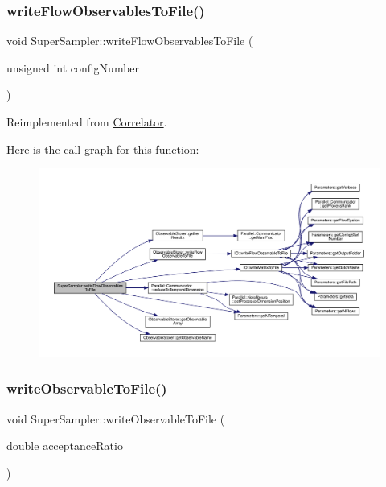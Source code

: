 \subsubsection{\texorpdfstring{writeFlowObservablesToFile()}{writeFlowObservablesToFile()}}
{\footnotesize\ttfamily void Super\+Sampler\+::write\+Flow\+Observables\+To\+File (\begin{DoxyParamCaption}\item[{unsigned int}]{config\+Number }\end{DoxyParamCaption})\hspace{0.3cm}{\ttfamily [virtual]}}



Reimplemented from \mbox{\hyperlink{class_correlator_a168512b2ce182d9478db47f100125fa6}{Correlator}}.

Here is the call graph for this function\+:\nopagebreak
\begin{figure}[H]
\begin{center}
\leavevmode
\includegraphics[width=350pt]{class_super_sampler_a410b650ebccdb03519c88908a3a8013e_cgraph}
\end{center}
\end{figure}
\mbox{\label{class_super_sampler_a05b42b82879233dc329d280a61bfd7f0}} 
\subsubsection{\texorpdfstring{writeObservableToFile()}{writeObservableToFile()}}
{\footnotesize\ttfamily void Super\+Sampler\+::write\+Observable\+To\+File (\begin{DoxyParamCaption}\item[{double}]{acceptance\+Ratio }\end{DoxyParamCaption})\hspace{0.3cm}{\ttfamily [virtual]}}



